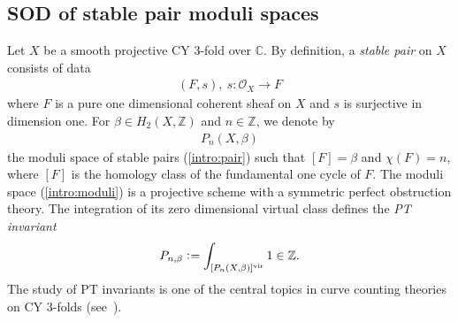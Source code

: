 \documentclass[11pt]{amsart}
\theoremstyle{plain}
\newcommand{\oO}{\mathcal{O}}
\begin{document}
\subsection{SOD of stable pair moduli spaces}
Let $X$ be a smooth projective CY 3-fold 
over $\mathbb{C}$. 
By definition, a \textit{stable pair}
on $X$ consists of data~\cite{PT}
\begin{align}\label{intro:pair}
(F, s), \ s \colon \oO_X \to F
\end{align}
where $F$ is a pure one dimensional coherent sheaf
on $X$ and $s$ is surjective in dimension one. 
For $\beta \in H_2(X, \mathbb{Z})$ and 
$n \in \mathbb{Z}$, we denote by 
\begin{align}\label{intro:moduli}
P_n(X, \beta)
\end{align}
the moduli space of stable pairs (\ref{intro:pair})
such that $[F]=\beta$ and $\chi(F)=n$, 
where $[F]$ is the homology class of the 
fundamental one 
cycle of $F$. 
The moduli space (\ref{intro:moduli}) is a projective scheme with 
a symmetric perfect obstruction theory. 
The integration of its zero dimensional virtual class defines 
the \textit{PT invariant} 
\begin{align*}
P_{n, \beta} \cneq \int_{[P_n(X, \beta)]^{\rm{vir}}}1 \in \mathbb{Z}.
\end{align*}
The study of PT invariants is one of the central 
topics in curve counting theories
on CY 3-folds (see~\cite{MR3221298}). 
\end{document}

